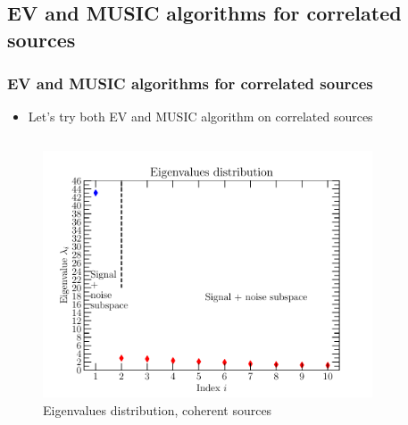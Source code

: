 \documentclass[UKenglish,8pt,aspectratio=1610]{beamer}
\begin{document}
\subsection{EV and MUSIC algorithms for correlated sources}
\begin{frame}
	\frametitle{EV and MUSIC algorithms for correlated sources \cite{twoDecades,uncini,Johnson1993ArraySP}}
\begin{itemize}
	\item Let's try both EV and MUSIC algorithm on correlated sources
\end{itemize}
	\begin{columns}
	\begin{column}{0.5\textwidth}
		\begin{figure}[h!]
			\centering
			\includegraphics[scale=0.45]{question8/part_A_question_8_eigenvalues_distribution.pdf}
			\caption{Eigenvalues distribution, coherent sources}
		\end{figure}
	\end{column}
	\begin{column}{0.5\textwidth}
		\begin{figure}[h!]
			\centering

\end{figure}
\end{column}
\end{columns}
\end{frame}
\end{document}
